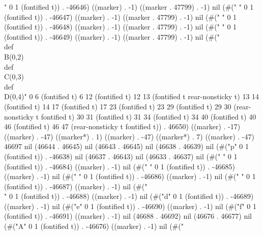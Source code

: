 " 0 1 (fontified t)) . -46646) ((marker) . -1) ((marker . 47799) . -1) nil (#(" " 0 1 (fontified t)) . -46647) ((marker) . -1) ((marker . 47799) . -1) nil (#(" " 0 1 (fontified t)) . -46648) ((marker) . -1) ((marker . 47799) . -1) nil (#(" " 0 1 (fontified t)) . -46649) ((marker) . -1) ((marker . 47799) . -1) nil (#("\\def\\B{(0,2)}
   \\def\\C{(0,3)}
   \\def\\D{(0,4)}" 0 6 (fontified t) 6 12 (fontified t) 12 13 (fontified t rear-nonsticky t) 13 14 (fontified t) 14 17 (fontified t) 17 23 (fontified t) 23 29 (fontified t) 29 30 (rear-nonsticky t fontified t) 30 31 (fontified t) 31 34 (fontified t) 34 40 (fontified t) 40 46 (fontified t) 46 47 (rear-nonsticky t fontified t)) . 46650) ((marker) . -17) ((marker) . -47) ((marker*) . 1) ((marker) . -47) ((marker*) . 7) ((marker) . -47) 46697 nil (46644 . 46645) nil (46643 . 46645) nil (46638 . 46639) nil (#("p" 0 1 (fontified t)) . -46638) nil (46637 . 46643) nil (46633 . 46637) nil (#("
" 0 1 (fontified t)) . -46684) ((marker) . -1) nil (#(" " 0 1 (fontified t)) . -46685) ((marker) . -1) nil (#(" " 0 1 (fontified t)) . -46686) ((marker) . -1) nil (#(" " 0 1 (fontified t)) . -46687) ((marker) . -1) nil (#("\\" 0 1 (fontified t)) . -46688) ((marker) . -1) nil (#("d" 0 1 (fontified t)) . -46689) ((marker) . -1) nil (#("e" 0 1 (fontified t)) . -46690) ((marker) . -1) nil (#("f" 0 1 (fontified t)) . -46691) ((marker) . -1) nil (46688 . 46692) nil (46676 . 46677) nil (#("A" 0 1 (fontified t)) . -46676) ((marker) . -1) nil (#("
